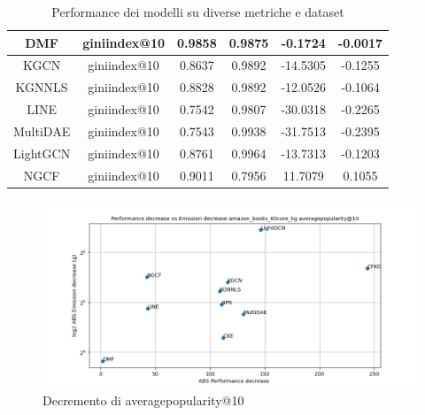 \begin{table}[H]
{\begin{tabular}{|c|c|c|c|c|c|}
    DMF              & giniindex@10     & 0.9858                        & 0.9875                          & -0.1724                               & -0.0017                               \\ \hline
    KGCN             & giniindex@10     & 0.8637                        & 0.9892                          & -14.5305                              & -0.1255                               \\ \hline
    KGNNLS           & giniindex@10     & 0.8828                        & 0.9892                          & -12.0526                              & -0.1064                               \\ \hline
    LINE             & giniindex@10     & 0.7542                        & 0.9807                          & -30.0318                              & -0.2265                               \\ \hline
    MultiDAE         & giniindex@10     & 0.7543                        & 0.9938                          & -31.7513                              & -0.2395                               \\ \hline
    LightGCN         & giniindex@10     & 0.8761                        & 0.9964                          & -13.7313                              & -0.1203                               \\ \hline
    NGCF             & giniindex@10     & 0.9011                        & 0.7956                          & 11.7079                               & 0.1055                                \\ \hline
    \end{tabular}
    }
    \caption{Performance dei modelli su diverse metriche e dataset}
    \end{table}


\begin{figure}[H]
    \centering
     \includegraphics[width=\textwidth]{images/decrement_averagepopularity@10_amazon_books_60core_kg.png}
    \caption{Decremento di averagepopularity@10}
\end{figure}

